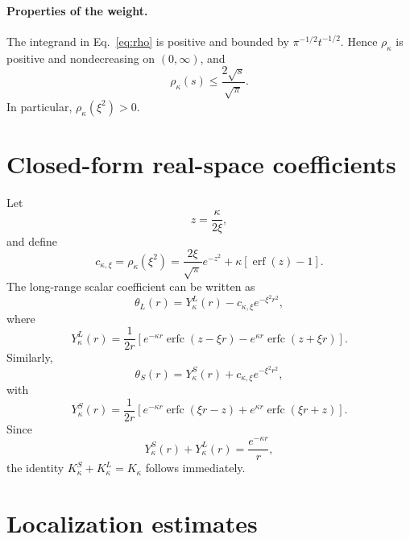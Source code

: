 \documentclass[11pt]{article}
\theoremstyle{plain}
\newcommand{\erfc}{\operatorname{erfc}}
\newcommand{\erf}{\operatorname{erf}}
\DeclareRobustCommand{\_}{\textunderscore\allowbreak}
\begin{document}
\paragraph{Properties of the weight.}
The integrand in Eq.~\eqref{eq:rho} is positive and bounded by
$\pi^{-1/2}t^{-1/2}$. Hence $\rho_\kappa$ is positive and nondecreasing
on $(0,\infty)$, and
\begin{equation}
\label{eq:rho-bound}
\rho_\kappa(s)\le\frac{2\sqrt{s}}{\sqrt{\pi}}.
\end{equation}
In particular, $\rho_\kappa(\xi^2)>0$.

\section{Closed-form real-space coefficients}
\label{app:closed-form}

Let
\begin{equation}
z=\frac{\kappa}{2\xi},
\end{equation}
and define
\begin{equation}
c_{\kappa,\xi}
=
\rho_\kappa(\xi^2)
=
\frac{2\xi}{\sqrt{\pi}}e^{-z^2}
+
\kappa\left[\erf(z)-1\right].
\end{equation}
The long-range scalar coefficient can be written as
\begin{equation}
\theta_L(r)
=
Y_\kappa^L(r)
-
c_{\kappa,\xi}e^{-\xi^2r^2},
\end{equation}
where
\begin{equation}
Y_\kappa^L(r)
=
\frac{1}{2r}
\left[
e^{-\kappa r}
\erfc\!\left(z-\xi r\right)
-
e^{\kappa r}
\erfc\!\left(z+\xi r\right)
\right].
\end{equation}
Similarly,
\begin{equation}
\theta_S(r)
=
Y_\kappa^S(r)
+
c_{\kappa,\xi}e^{-\xi^2r^2},
\end{equation}
with
\begin{equation}
Y_\kappa^S(r)
=
\frac{1}{2r}
\left[
e^{-\kappa r}
\erfc\!\left(\xi r-z\right)
+
e^{\kappa r}
\erfc\!\left(\xi r+z\right)
\right].
\end{equation}
Since
\begin{equation}
Y_\kappa^S(r)+Y_\kappa^L(r)
=
\frac{e^{-\kappa r}}{r},
\end{equation}
the identity \(K_\kappa^S+K_\kappa^L=K_\kappa\) follows immediately.

\section{Localization estimates}
\label{app:localization}
\end{document}
